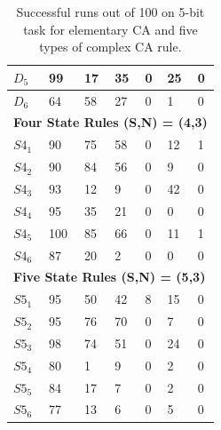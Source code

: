 \documentclass{elsarticle}
\begin{document}
\begin{multicols}{2}
\begin{table}[!htbp]
\begin{tabular}{|l|l|l|l|l|l|l|}
$D_{5}$ & 99 & 17 & 35 & 0 & 25 & 0 \\ \hline
$D_{6}$ & 64 & 58 & 27 & 0 & 1 & 0 \\ \hline
\multicolumn{7}{|l|}{\textbf{Four State Rules (S,N) = (4,3)}} \\ \hline
$S4_{1}$ & 90 & 75 & 58 & 0 & 12  & 1 \\ \hline
$S4_{2}$ & 90 & 84 & 56 & 0 & 9 & 0  \\ \hline
$S4_{3}$ & 93 & 12 & 9 & 0 & 42 & 0 \\ \hline
$S4_{4}$ & 95 & 35 & 21 & 0 & 0 & 0 \\ \hline
$S4_{5}$ & 100 & 85 & 66 & 0 & 11 & 1 \\ \hline
$S4_{6}$ & 87 & 20 & 2 & 0 & 0 & 0 \\ \hline
\multicolumn{7}{|l|}{\textbf{Five State Rules (S,N) = (5,3)}} \\ \hline
$S5_{1}$ & 95 & 50 & 42 & 8 & 15 & 0 \\ \hline
$S5_{2}$ & 95 & 76 & 70 & 0 & 7 & 0 \\ \hline
$S5_{3}$ & 98 & 74 & 51 & 0 & 24 & 0 \\ \hline
$S5_{4}$ & 80 & 1 & 9 & 0 & 2 & 0 \\ \hline
$S5_{5}$ & 84 & 17 & 7 & 0 & 2 & 0 \\ \hline
$S5_{6}$ & 77 & 13 & 6 & 0 & 5 & 0 \\ \hline
\end{tabular}
\caption{Successful runs out of 100 on 5-bit task for elementary CA and five 
    types of complex CA rule.}
\label{table:results}
\end{table}




\end{multicols}
\end{document}
